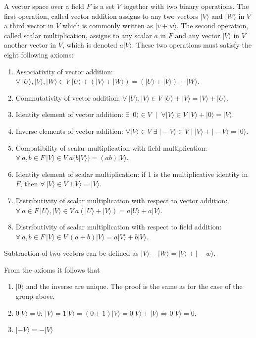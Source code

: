 \documentclass[11pt,fleqn]{book} %
\newcommand{\ket}[1]{| #1\rangle}
\begin{document}
\begin{definition}
A vector space over a field $F$ is a set $V$ together with two binary operations. 
The first operation, called vector addition assigns to any two vectors $\ket{V}$ and $\ket{W}$ in $V$ a third vector in $V$ which is commonly written as $\ket{v+w}$.
The second operation, called scalar multiplication, assigns to any scalar $a$ in $F$ and any vector $\ket{V}$ in $V$ another vector in $V$, which is denoted $a\ket{V}$.
These two operations must satisfy the eight following axioms:
\begin{enumerate}
    \item Associativity of vector addition:
    $\forall\: \ket{U}, \ket{V}, \ket{W} \in V\; \ket{U}+(\ket{V}+\ket{W}) = (\ket{U}+\ket{V})+\ket{W}$.
    \item Commutativity of vector addition: $\forall\: \ket{U}, \ket{V} \in V\; \ket{U}+\ket{V}=\ket{V}+\ket{U}$.
    \item Identity element of vector addition:
    $\exists\: \ket{0}\in V\;\mid\;\forall \ket{V}\in V\;\ket{V} + \ket{0}= \ket{V}$. 
    \item Inverse elements of vector addition: $\forall \ket{V}\in V\;\exists\; \ket{-V}\in V \mid 
    \ket{V}+\ket{-V}=\ket{0}$.
    \item Compatibility of scalar multiplication with field multiplication:\\
    $\forall\: a,b\in F\: \ket{V}\in V\;a(b\ket{V}) = (ab)\ket{V}$.
    \item Identity element of scalar multiplication: if $1$ is the multiplicative identity in $F$, then $\forall\:\ket{V}\in V\;1\ket{V}=\ket{V}$.
    \item Distributivity of scalar multiplication with respect to vector addition: $\forall\: a\in F\:\ket{U},\ket{V}\in V\: a(\ket{U}+\ket{V})=a\ket{U}+a\ket{V}$.
    \item Distributivity of scalar multiplication with respect to field addition: 
    $\forall\: a,b\in F\:\ket{V}\in V\:(a+b)\ket{V} = a\ket{V}+b\ket{V}$.
\end{enumerate}
Subtraction of two vectors can be defined as $\ket{V}-\ket{W} = \ket{V} + \ket{-w}$.
\end{definition}

\begin{remark}
    From the axioms it follows that 
    \begin{enumerate}
        \item $\ket{0}$ and the inverse are unique. The proof is the same as for the case of the group above.
        \item $0\ket{V}=0$: $\ket{V}=1\ket{V}=(0+1)\ket{V}=0\ket{V}+\ket{V}\Rightarrow 0\ket{V}=0$.
        \item $\ket{-V}=-\ket{V}$
    \end{enumerate}
\end{remark}
\end{document}
